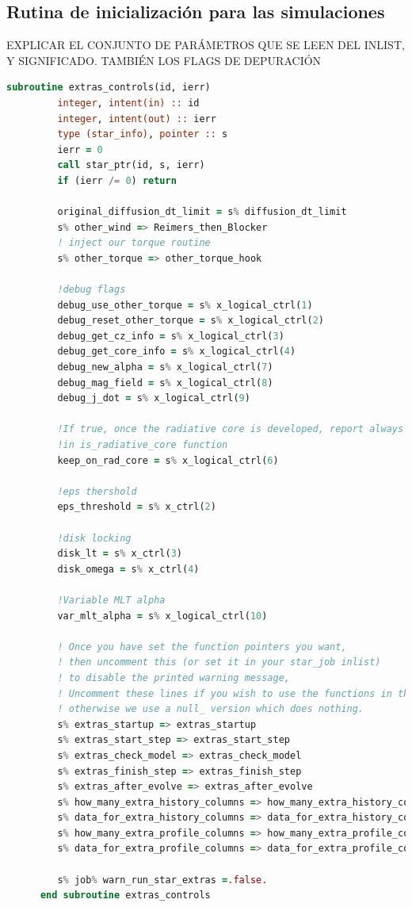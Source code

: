 \subsection{Rutina de inicialización para las simulaciones}
EXPLICAR EL CONJUNTO DE PARÁMETROS QUE SE LEEN DEL INLIST, Y SIGNIFICADO. TAMBIÉN LOS FLAGS DE DEPURACIÓN
\begin{lstlisting}[language=Fortran, caption={Rutina de inicialización de las simulacions.}, label={lst:extras_ctrl}]
      subroutine extras_controls(id, ierr)
         integer, intent(in) :: id
         integer, intent(out) :: ierr
         type (star_info), pointer :: s
         ierr = 0
         call star_ptr(id, s, ierr)
         if (ierr /= 0) return
         
         original_diffusion_dt_limit = s% diffusion_dt_limit
         s% other_wind => Reimers_then_Blocker
         ! inject our torque routine
         s% other_torque => other_torque_hook

         !debug flags
         debug_use_other_torque = s% x_logical_ctrl(1)
         debug_reset_other_torque = s% x_logical_ctrl(2)
         debug_get_cz_info = s% x_logical_ctrl(3)
         debug_get_core_info = s% x_logical_ctrl(4)
         debug_new_alpha = s% x_logical_ctrl(7)
         debug_mag_field = s% x_logical_ctrl(8)
         debug_j_dot = s% x_logical_ctrl(9)

         !If true, once the radiative core is developed, report always true
         !in is_radiative_core function
         keep_on_rad_core = s% x_logical_ctrl(6)

         !eps thershold
         eps_threshold = s% x_ctrl(2)

         !disk locking
         disk_lt = s% x_ctrl(3)
         disk_omega = s% x_ctrl(4)

         !Variable MLT alpha
         var_mlt_alpha = s% x_logical_ctrl(10)
      
         ! Once you have set the function pointers you want,
         ! then uncomment this (or set it in your star_job inlist)
         ! to disable the printed warning message,
         ! Uncomment these lines if you wish to use the functions in this file,
         ! otherwise we use a null_ version which does nothing.
         s% extras_startup => extras_startup
         s% extras_start_step => extras_start_step
         s% extras_check_model => extras_check_model         
         s% extras_finish_step => extras_finish_step
         s% extras_after_evolve => extras_after_evolve
         s% how_many_extra_history_columns => how_many_extra_history_columns
         s% data_for_extra_history_columns => data_for_extra_history_columns
         s% how_many_extra_profile_columns => how_many_extra_profile_columns
         s% data_for_extra_profile_columns => data_for_extra_profile_columns  
         
         s% job% warn_run_star_extras =.false.             
      end subroutine extras_controls
\end{lstlisting}

